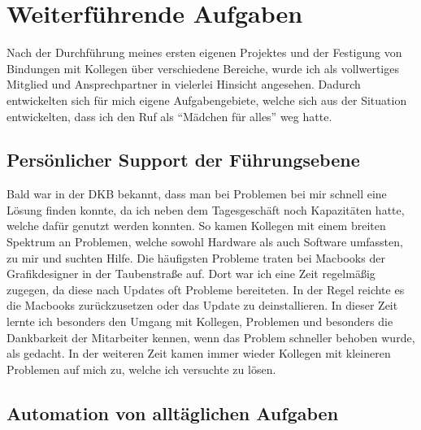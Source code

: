 \section{Weiterführende Aufgaben }
\label{sec:Weiterführende Aufgaben}

Nach der Durchführung meines ersten eigenen Projektes und der Festigung von Bindungen mit Kollegen über verschiedene Bereiche, wurde ich als vollwertiges Mitglied und Ansprechpartner in vielerlei Hinsicht angesehen. Dadurch entwickelten sich für mich eigene Aufgabengebiete, welche sich aus der Situation entwickelten, dass ich den Ruf als “Mädchen für alles” weg hatte. 

\subsection{Persönlicher Support der Führungsebene}
\label{sec:WPersönlicher Support der Führungsebene}

Bald war in der DKB bekannt, dass man bei Problemen bei mir schnell eine Lösung finden konnte, da ich neben dem Tagesgeschäft noch Kapazitäten hatte, welche dafür genutzt werden konnten. So kamen Kollegen mit einem breiten Spektrum an Problemen, welche sowohl Hardware als auch Software umfassten, zu mir und suchten Hilfe. Die häufigsten Probleme traten bei Macbooks der Grafikdesigner in der Taubenstraße auf. Dort war ich eine Zeit regelmäßig zugegen, da diese nach Updates oft Probleme bereiteten. In der Regel reichte es die Macbooks zurückzusetzen oder das Update zu deinstallieren. In dieser Zeit lernte ich besonders den Umgang mit Kollegen, Problemen und besonders die Dankbarkeit der Mitarbeiter kennen, wenn das Problem schneller behoben wurde, als gedacht. In der weiteren Zeit kamen immer wieder Kollegen mit kleineren Problemen auf mich zu, welche ich versuchte zu lösen.

\subsection{Automation von alltäglichen Aufgaben}
\label{sec:Automation von alltäglichen Aufgaben}

